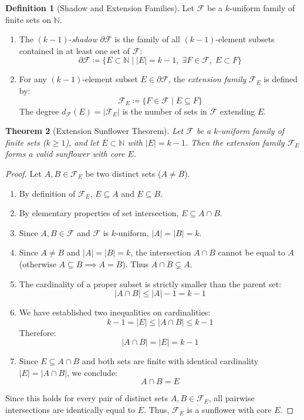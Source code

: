\documentclass[11pt,a4paper]{article}
\newtheorem{theorem}{Theorem}[section]
\theoremstyle{definition}
\newtheorem{definition}[theorem]{Definition}
\begin{document}
\begin{definition}[Shadow and Extension Families]\label{def:shadow}
Let $\mathcal{F}$ be a $k$-uniform family of finite sets on $\mathbb{N}$.
\begin{enumerate}
    \item The $(k-1)$-\emph{shadow} $\partial \mathcal{F}$ is the family of all $(k-1)$-element subsets contained in at least one set of $\mathcal{F}$:
    \begin{equation}\label{eq:shadow_def}
    \partial \mathcal{F} \coloneqq \{ E \subset \mathbb{N} \mid |E| = k - 1, \; \exists F \in \mathcal{F}, \; E \subset F \}
    \end{equation}
    \item For any $(k-1)$-element subset $E \in \partial \mathcal{F}$, the \emph{extension family} $\mathcal{F}_E$ is defined by:
    \begin{equation}\label{eq:ext_def}
    \mathcal{F}_E \coloneqq \{ F \in \mathcal{F} \mid E \subseteq F \}
    \end{equation}
    The degree $d_\mathcal{F}(E) = |\mathcal{F}_E|$ is the number of sets in $\mathcal{F}$ extending $E$.
\end{enumerate}
\end{definition}

\begin{theorem}[Extension Sunflower Theorem]\label{thm:ext_sunflower}
Let $\mathcal{F}$ be a $k$-uniform family of finite sets ($k \ge 1$), and let $E \subset \mathbb{N}$ with $|E| = k - 1$.
Then the extension family $\mathcal{F}_E$ forms a valid sunflower with core $E$.
\end{theorem}

\begin{proof}
Let $A, B \in \mathcal{F}_E$ be two distinct sets ($A \ne B$).
\begin{enumerate}
    \item By definition of $\mathcal{F}_E$, $E \subseteq A$ and $E \subseteq B$.
    \item By elementary properties of set intersection, $E \subseteq A \cap B$.
    \item Since $A, B \in \mathcal{F}$ and $\mathcal{F}$ is $k$-uniform, $|A| = |B| = k$.
    \item Since $A \ne B$ and $|A| = |B| = k$, the intersection $A \cap B$ cannot be equal to $A$ (otherwise $A \subseteq B \implies A = B$). Thus $A \cap B \subsetneq A$.
    \item The cardinality of a proper subset is strictly smaller than the parent set:
    \[ |A \cap B| \le |A| - 1 = k - 1 \]
    \item We have established two inequalities on cardinalities:
    \[ k - 1 = |E| \le |A \cap B| \le k - 1 \]
    Therefore:
    \[ |A \cap B| = |E| = k - 1 \]
    \item Since $E \subseteq A \cap B$ and both sets are finite with identical cardinality $|E| = |A \cap B|$, we conclude:
    \[ A \cap B = E \]
\end{enumerate}
Since this holds for every pair of distinct sets $A, B \in \mathcal{F}_E$, all pairwise intersections are identically equal to $E$.
Thus, $\mathcal{F}_E$ is a sunflower with core $E$.
\end{proof}
\end{document}

